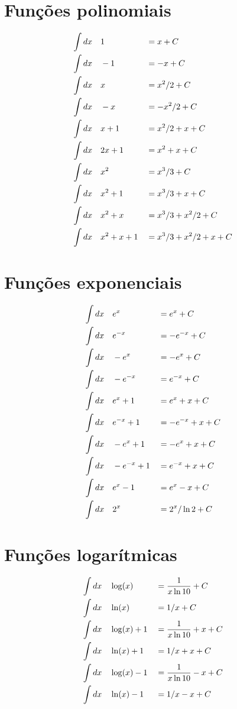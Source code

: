 \documentclass[a4paper,12pt]{article}
\newcommand\pair[2]{\ensuremath{\int dx&\quad#1 &&= #2 + C}}
\begin{document}
  \section{Funções polinomiais}
  
  \begin{align*}
    \pair{1}{x} \\
    \pair{-1}{-x} \\
    \pair{x}{x^2/2} \\
    \pair{-x}{-x^2/2} \\
    \pair{x+1}{x^2/2+x} \\
    \pair{2x+1}{x^2+x} \\
    \pair{x^2}{x^3/3} \\
    \pair{x^2+1}{x^3/3 + x} \\
    \pair{x^2+x}{x^3/3 + x^2/2} \\
    \pair{x^2+x+1}{x^3/3 + x^2/2 + x}
  \end{align*}

  \section{Funções exponenciais}
  \begin{align*}
    \pair{e^x}{e^x} \\
    \pair{e^{-x}}{-e^{-x}} \\
    \pair{-e^{x}}{-e^x} \\
    \pair{-e^{-x}}{e^{-x}} \\
    \pair{e^x+1}{e^x+x} \\
    \pair{e^{-x}+1}{-e^{-x}+x} \\
    \pair{-e^x+1}{-e^x+x} \\
    \pair{-e^{-x}+1}{e^{-x}+x} \\
    \pair{e^x-1}{e^x-x} \\
    \pair{2^x}{2^x/\ln 2}
  \end{align*}

  \section{Funções logarítmicas}
  \begin{align*}
    \pair{\log(x)}{\frac{1}{x\ln 10}} \\
    \pair{\ln(x)}{1/x} \\
    \pair{\log(x)+1}{\frac{1}{x\ln 10}+x} \\
    \pair{\ln(x)+1}{1/x+x} \\
    \pair{\log(x)-1}{\frac{1}{x\ln 10}-x} \\
    \pair{\ln(x)-1}{1/x-x}
  \end{align*}
  
\end{document}
